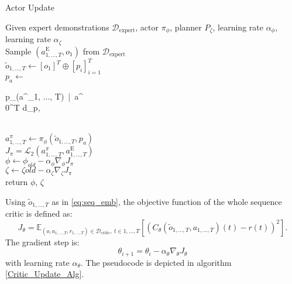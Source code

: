 \begin{algorithm}
    \caption{Actor Update}
    \label{Actor_Update_Alg}
    \begin{algorithmic}
    \Require Given expert demonstrations $\mathcal{D}_{\text{expert}}$, actor $\pi_{\phi}$, planner $P_{\zeta}$, 
    learning rate $\alpha_{\phi}$, learning rate $\alpha_{\zeta}$\\
    \State Sample $(a^{\text{E}}_{1, ..., T}, o_1)$ from $\mathcal{D}_{\text{expert}}$\\
    \State $\tilde{o}_{1, ..., T} \gets [o_1]^T \oplus [p_i]_{i=1}^T$ \hfill{} \\
    \State $p_a \gets $
    \begin{cases}
        p_{\zeta}(a^{}_{1, ..., T})\ |\ a^{} \notin {}\\
        0^{T \times d_p}, 
    \end{cases} \hfill{} \\
    \State $a^\pi_{1,...,T} \gets \pi_{\phi}(\tilde{o}_{1, ..., T}, p_a)$ \hfill{} \\
    \State $J_{\pi} = \mathcal{L}_2(a^\pi_{1,...,T}, a^{\text{E}}_{1, ..., T})$ \hfill{} \\
    \State $\phi \gets \phi_{old} - \alpha_{\phi} \nabla_{\phi}J_{\pi}$\\
    $\zeta \gets \zeta{old} - \alpha_{\zeta} \nabla_{\zeta}J_{\pi}$ \hfill{} \\
    \State return $\phi$, $\zeta$
\end{algorithmic}
\end{algorithm}
Using $\tilde{o}_{1, ..., T}$ as in \ref{eq:seq_emb}, the objective function of the whole sequence critic is defined as:
\begin{equation}
    J_{\theta} = \mathbb{E}_{(o, a_{1,...,T}, r_{1,...,T}) \in \mathcal{D}_{\text{critic}},\ t \in {1, ..., T}}\left[(C_{\theta}(\tilde{o}_{1, ..., T}, a_{1,...,T})(t) - r(t))^2\right].
\end{equation}
The gradient step is:
\begin{equation*}
    \theta_{i+1} = \theta_i - \alpha_{\theta} \nabla_{\theta}J_{\theta}
\end{equation*}
with learning rate $\alpha_{\theta}$. The pseudocode is depicted in algorithm \ref{Critic_Update_Alg}.
